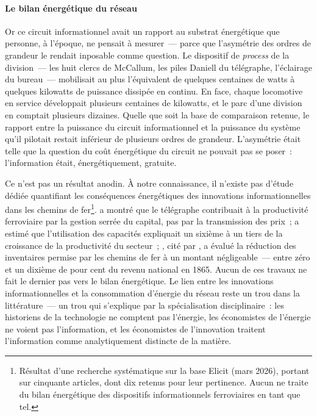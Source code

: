 \paragraph{Le bilan énergétique du réseau}

Or ce circuit informationnel avait un rapport au substrat énergétique que personne, à l'époque, ne pensait à mesurer~--- parce que l'asymétrie des ordres de grandeur le rendait inposable comme question. Le dispositif de \emph{process} de la division~--- les huit clercs de McCallum, les piles Daniell du télégraphe, l'éclairage du bureau~--- mobilisait au plus l'équivalent de quelques centaines de watts à quelques kilowatts de puissance dissipée en continu. En face, chaque locomotive en service développait plusieurs centaines de kilowatts, et le parc d'une division en comptait plusieurs dizaines. %
Quelle que soit la base de comparaison retenue, le rapport entre la puissance du circuit informationnel et la puissance du système qu'il pilotait restait inférieur de plusieurs ordres de grandeur. L'asymétrie était telle que la question du coût énergétique du circuit ne pouvait pas se poser~: l'information était, énergétiquement, gratuite.

Ce n'est pas un résultat anodin. À notre connaissance, il n'existe pas d'étude dédiée quantifiant les conséquences énergétiques des innovations informationnelles dans les chemins de fer\footnote{Résultat d'une recherche systématique sur la base Elicit (mars 2026), portant sur cinquante articles, dont dix retenus pour leur pertinence. Aucun ne traite du bilan énergétique des dispositifs informationnels ferroviaires en tant que tel.}. \textcite{field_magnetic_1992} a montré que le télégraphe contribuait à la productivité ferroviaire par la gestion serrée du capital, pas par la transmission des prix~; \textcite{fishlow_productivity_1966} a estimé que l'utilisation des capacités expliquait un sixième à un tiers de la croissance de la productivité du secteur~; \textcite{hawke_railways_1970}, cité par \textcite[p.~123--124]{miller_railway_2003}, a évalué la réduction des inventaires permise par les chemins de fer à un montant négligeable~--- entre zéro et un dixième de pour cent du revenu national en 1865. Aucun de ces travaux ne fait le dernier pas vers le bilan énergétique. Le lien entre les innovations informationnelles et la consommation d'énergie du réseau reste un trou dans la littérature~--- un trou qui s'explique par la spécialisation disciplinaire~: les historiens de la technologie ne comptent pas l'énergie, les économistes de l'énergie ne voient pas l'information, et les économistes de l'innovation traitent l'information comme analytiquement distincte de la matière.

